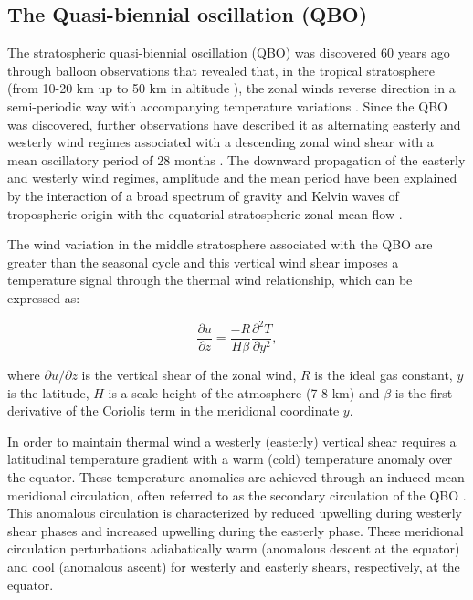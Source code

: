 \subsection{The Quasi-biennial oscillation (QBO)}

The stratospheric quasi-biennial oscillation (QBO) was discovered 60 years ago through balloon observations  that revealed that, in the tropical stratosphere (from 10-20 km up to 50 km in altitude \citep{andrews1987}), the zonal winds reverse direction in a semi-periodic way with accompanying temperature variations \citep{ebdon1960,reed1964}. Since the QBO was discovered, further observations have described it as alternating easterly and westerly wind regimes associated with a descending zonal wind shear with a mean oscillatory period of 28 months \citep{baldwin2001}. 
The downward propagation of the easterly and westerly wind regimes, amplitude and the mean period have been explained by the interaction of a broad spectrum of gravity and Kelvin waves of tropospheric origin with the equatorial stratospheric zonal mean flow  \citep{baldwin2001}.

The wind variation in the middle stratosphere associated with the QBO are greater than the seasonal cycle \citep{andrews1987} and this vertical wind shear imposes a temperature signal through the thermal wind relationship, which can be expressed as: 

\begin{equation}
\frac{\partial{u}}{\partial{z}}=\frac{-R}{H \beta}\frac{\partial^2 T}{\partial y^2}, 
\end{equation}

\noindent where $\partial u / \partial z$ is the vertical shear of the zonal wind, $R$ is the ideal gas constant, $y$ is the latitude, $H$ is a scale height of the atmosphere (7-8 km) and $\beta$ is the first derivative of the Coriolis term in the meridional coordinate $y$. 

In order to maintain thermal wind a westerly (easterly) vertical shear requires a latitudinal temperature gradient with a warm (cold) temperature anomaly over the equator. These temperature anomalies are achieved through an induced mean meridional circulation, often referred to as the secondary circulation of the QBO \citep{plumb1982,li1995,baldwin2001,ribera2004}. This anomalous circulation is characterized by reduced upwelling during westerly shear phases and increased upwelling during the easterly phase. These meridional circulation perturbations adiabatically warm (anomalous descent at the equator) and cool (anomalous ascent) for westerly and easterly shears, respectively, at the equator. 


